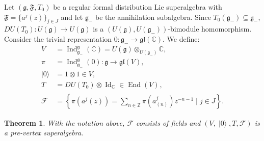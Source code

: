 \documentclass[a4paper, 12pt, reqno]{amsart}
\newtheorem{theorem}{Theorem}[section]
\theoremstyle{remark}
\numberwithin{equation}{subsection}
\DeclareMathOperator{\Id}{Id}
\DeclareMathOperator{\End}{End}
\DeclareMathOperator{\Ind}{Ind}
\DeclareMathOperator{\vac}{|0\rangle}
\DeclareMathOperator{\zero}{\overline{0}}
\begin{document}
Let $(\mathfrak{g}, \mathfrak{F}, T_0)$ be a regular formal distribution Lie superalgebra with $\mathfrak{F} = \{a^j(z)\}_{j \in J}$ and let $\mathfrak{g}_-$ be the annihilation subalgebra.
Since $T_0(\mathfrak{g}_-) \subseteq \mathfrak{g}_-$, $DU(T_0): U(\mathfrak{g}) \to U(\mathfrak{g})$ is a $(U(\mathfrak{g}), U(\mathfrak{g}_-))$-bimodule homomorphism.
Consider the trivial representation $0: \mathfrak{g}_- \to \mathfrak{gl}(\mathbb{C})$.
We define:
\begin{align*}
  V &= \Ind^{\mathfrak{g}}_{\mathfrak{g}_-}(\mathbb{C}) = U(\mathfrak{g}) \otimes_{U(\mathfrak{g}_-)} \mathbb{C}, \\
  \pi &= \Ind^{\mathfrak{g}}_{\mathfrak{g}_-}(0): \mathfrak{g} \to \mathfrak{gl}(V), \\
  \vac &= 1\otimes1 \in V, \\
  T &= DU(T_0) \otimes \Id_{\mathbb{C}} \in \End(V)_{\zero}, \\
  \mathcal{F} &= \left\{\pi(a^j(z)) = \sum_{n \in \mathbb{Z}}\pi(a^j_{(n)})z^{-n - 1} \mid j \in J\right\}.
\end{align*}

\begin{theorem}
  \label{thr:19}
  With the notation above, $\mathcal{F}$ consists of fields and $(V, \vac, T, \mathcal{F})$ is a pre-vertex superalgebra.
\end{theorem}
\end{document}
